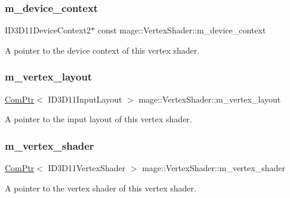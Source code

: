 \subsubsection{\texorpdfstring{m\+\_\+device\+\_\+context}{m\_device\_context}}
{\footnotesize\ttfamily I\+D3\+D11\+Device\+Context2$\ast$ const mage\+::\+Vertex\+Shader\+::m\+\_\+device\+\_\+context\hspace{0.3cm}{\ttfamily [protected]}}

A pointer to the device context of this vertex shader. \hypertarget{classmage_1_1_vertex_shader_a9b9895650b8c7f80af846d75f7d9ddda}{}\label{classmage_1_1_vertex_shader_a9b9895650b8c7f80af846d75f7d9ddda} 
\subsubsection{\texorpdfstring{m\+\_\+vertex\+\_\+layout}{m\_vertex\_layout}}
{\footnotesize\ttfamily \hyperlink{namespacemage_ae74f374780900893caa5555d1031fd79}{Com\+Ptr}$<$ I\+D3\+D11\+Input\+Layout $>$ mage\+::\+Vertex\+Shader\+::m\+\_\+vertex\+\_\+layout\hspace{0.3cm}{\ttfamily [protected]}}

A pointer to the input layout of this vertex shader. \hypertarget{classmage_1_1_vertex_shader_a0b2b02abae4cb226c115d7f1c5464a54}{}\label{classmage_1_1_vertex_shader_a0b2b02abae4cb226c115d7f1c5464a54} 
\subsubsection{\texorpdfstring{m\+\_\+vertex\+\_\+shader}{m\_vertex\_shader}}
{\footnotesize\ttfamily \hyperlink{namespacemage_ae74f374780900893caa5555d1031fd79}{Com\+Ptr}$<$ I\+D3\+D11\+Vertex\+Shader $>$ mage\+::\+Vertex\+Shader\+::m\+\_\+vertex\+\_\+shader\hspace{0.3cm}{\ttfamily [protected]}}

A pointer to the vertex shader of this vertex shader. 